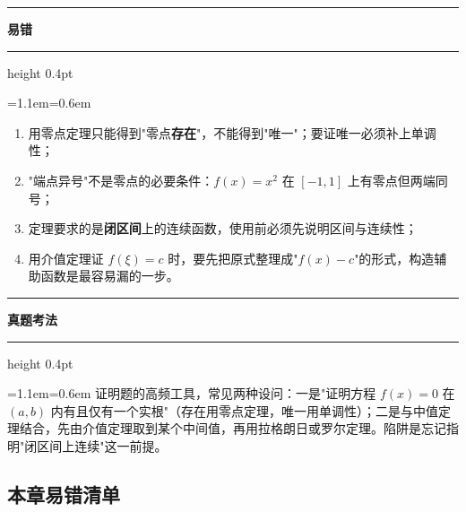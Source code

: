 \documentclass[11pt,openany,UTF8]{ctexbook}
\newcommand{\callouthead}[2]{%
  \par\addvspace{7pt}\noindent
  {\color{#1}\rule[-0.15em]{3pt}{1.05em}}\hspace{0.5em}%
  {\bfseries\color{#1}#2}\par\nobreak\vspace{-0.35em}%
  {\color{rulesep}\hrule height 0.4pt}\nobreak\vspace{0.45em}%
  \begingroup\small\setlength{\parindent}{0pt}%
  \leftskip=1.1em\rightskip=0.6em\noindent\ignorespaces}
\newcommand{\calloutend}{\par\endgroup\addvspace{7pt}}
\newenvironment{callwarn}[1]{\callouthead{warnbar}{#1}}{\calloutend}
\newenvironment{callexam}[1]{\callouthead{exambar}{#1}}{\calloutend}
\begin{document}
\begin{callwarn}{易错}
\begin{enumerate}
\item 用零点定理只能得到"零点\textbf{存在}"，不能得到"唯一"；要证唯一必须补上单调性；
\item "端点异号"不是零点的必要条件：$f(x)=x^{2}$ 在 $[-1,1]$ 上有零点但两端同号；
\item 定理要求的是\textbf{闭区间}上的连续函数，使用前必须先说明区间与连续性；
\item 用介值定理证 $f(\xi)=c$ 时，要先把原式整理成"$f(x)-c$"的形式，构造辅助函数是最容易漏的一步。
\end{enumerate}
\end{callwarn}

\begin{callexam}{真题考法}
证明题的高频工具，常见两种设问：一是"证明方程 $f(x)=0$ 在 $(a,b)$ 内有且仅有一个实根"（存在用零点定理，唯一用单调性）；二是与中值定理结合，先由介值定理取到某个中间值，再用拉格朗日或罗尔定理。陷阱是忘记指明"闭区间上连续"这一前提。

\end{callexam}

\subsection*{本章易错清单}
\end{document}
